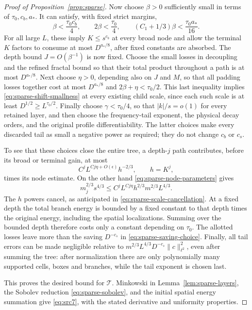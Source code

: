 \begin{proof}[Proof of Proposition~\ref{prop:sparse}]
Now choose $\beta>0$ sufficiently small in terms of $\tau_0,c_b,a_*$.
It can satisfy, with fixed strict margins,
\[
 \beta<\frac{\tau_0c_b}{4},\qquad
 2\beta<\frac{\tau_0}{4},\qquad
 (C_1+1/3)\beta<\frac{\tau_0a_*}{16}.
\]
For all large $L$, these imply $K\le s^{c_b}$ at every broad node and
allow the terminal $K$ factors to consume at most $D^{a_*/8}$, after
fixed constants are absorbed.  The depth bound $J=O(\beta^{-1})$ is
now fixed.  Choose the small losses in decoupling and the refined
fractal bound so that their total product throughout a path is at
most $D^{a_*/8}$.  Next choose $\eta>0$, depending also on $J$ and
$M$, so that all padding losses together cost at most $D^{a_*/8}$
and
$2\beta+\eta<\tau_0/2$.  This last inequality implies
\eqref{eq:sparse-shift-smallness} at every existing child scale, since
each such scale is at least $D^{1/2}\ge L^{\tau_0/2}$.
Finally choose $\gamma<\tau_0/4$, so that $|k|/s=o(1)$ for every
retained layer, and then choose the frequency-tail exponent, the
physical decay orders, and the original profile differentiability.
The latter choices make every discarded tail as small a negative
power as required; they do not change $c_b$ or $c_s$.

To see that these choices close the entire tree, a depth-$j$ path
contributes, before its broad or terminal gain, at most
\[
 C^j L^{Cj\eta+O(\epsilon)}h^{-2/3},
 \qquad h=K^j,
\]
times its node estimate.  On the other hand
\eqref{eq:sparse-node-parameters} gives
\[
 m_j^{2/3}s^{4/3}
 \le C^jL^{Cj\eta}h^{2/3}m^{2/3}L^{4/3}.
\]
The $h$ powers cancel, as anticipated in
\eqref{eq:sparse-scale-cancellation}.  At a fixed depth the total
branch energy is bounded by a fixed constant to that depth times the
original energy, including the spatial localizations.  Summing over
the bounded depth therefore costs only a constant depending on
$\tau_0$.  The allotted losses leave more than the saving $D^{-c_s}$
in \eqref{eq:sparse-saving-choice}.  Finally, all tail errors can be
made negligible relative to
$m^{2/3}L^{4/3}D^{-c_s}\|c\|_{\ell^2}^2$, even after summing the
tree: after normalization there are only polynomially many supported
cells, boxes and branches, while the tail exponent is chosen last.

This proves the desired bound for $\mathcal T$.  Minkowski in
Lemma~\ref{lem:sparse-layers}, the Sobolev reduction
\eqref{eq:sparse-sobolev}, and the initial spatial energy summation
give \eqref{eq:src7}, with the stated derivative and uniformity
properties.
\end{proof}
